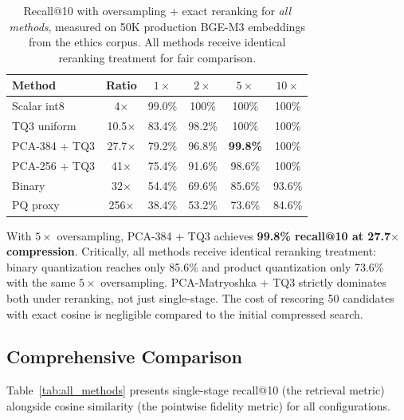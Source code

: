\documentclass[journal]{IEEEtran}
\begin{document}
\begin{table}[h]
\centering
\caption{Recall@10 with oversampling + exact reranking for \emph{all methods},
measured on 50K production BGE-M3 embeddings from the ethics corpus.  All
methods receive identical reranking treatment for fair comparison.}
\label{tab:reranking}
\begin{tabular}{lccccc}
\toprule
Method & Ratio & $1\times$ & $2\times$ & $5\times$ & $10\times$ \\
\midrule
Scalar int8       & 4$\times$     & 99.0\% & 100\%  & 100\%  & 100\%  \\
TQ3 uniform       & 10.5$\times$  & 83.4\% & 98.2\% & 100\%  & 100\%  \\
PCA-384 + TQ3     & 27.7$\times$  & 79.2\% & 96.8\% & \textbf{99.8\%} & 100\%  \\
PCA-256 + TQ3     & 41$\times$    & 75.4\% & 91.6\% & 98.6\% & 100\%  \\
Binary            & 32$\times$    & 54.4\% & 69.6\% & 85.6\% & 93.6\% \\
PQ proxy          & 256$\times$   & 38.4\% & 53.2\% & 73.6\% & 84.6\% \\
\bottomrule
\end{tabular}
\end{table}

With $5\times$ oversampling, PCA-384 + TQ3 achieves \textbf{99.8\% recall@10
at 27.7$\times$ compression}.  Critically, all methods receive identical
reranking treatment: binary quantization reaches only 85.6\% and product
quantization only 73.6\% with the same $5\times$ oversampling.  PCA-Matryoshka
+ TQ3 strictly dominates both under reranking, not just single-stage.
The cost of rescoring 50 candidates with exact cosine is negligible
compared to the initial compressed search.

\subsection{Comprehensive Comparison}

Table~\ref{tab:all_methods} presents single-stage recall@10 (the retrieval
metric) alongside cosine similarity (the pointwise fidelity metric) for all
configurations.
\end{document}
